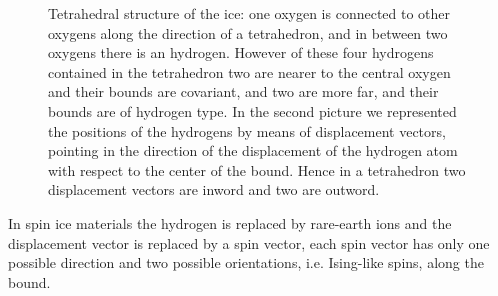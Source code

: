 \documentclass[../main/main.tex]{subfiles}
\begin{document}
\begin{figure}[h]
\caption{Tetrahedral structure of the ice: one oxygen is connected to other oxygens along the direction of a tetrahedron, and in between two oxygens there is an hydrogen. However of these four hydrogens contained in the tetrahedron two are nearer to the central oxygen and their bounds are covariant, and two are more far, and their bounds are of hydrogen type. In the second picture we represented the positions of the hydrogens by means of displacement vectors, pointing in the direction of the displacement of the hydrogen atom with respect to the center of the bound. Hence in a tetrahedron two displacement vectors are inword and two are outword.}
\label{fig:ice}
\end{figure}

In spin ice materials the hydrogen is replaced by rare-earth ions and the displacement vector is replaced by a spin vector, each spin vector has only one possible direction and two possible orientations, i.e. Ising-like spins, along the bound. 
\end{document}
